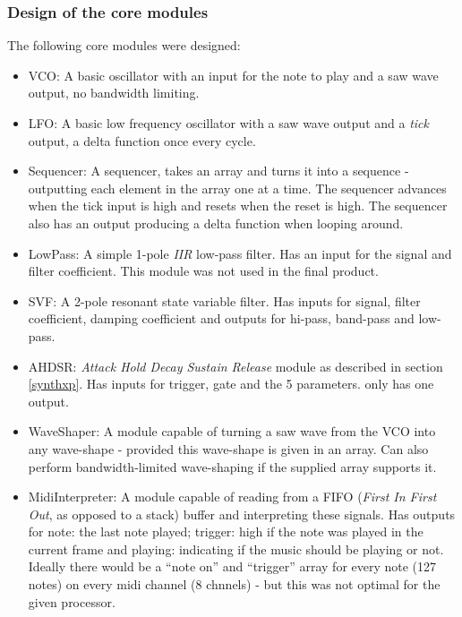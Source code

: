 \subsubsection{Design of the core modules}
The following core modules were designed:
\begin{itemize}
  \item VCO: A basic oscillator with an input for the note to play and a saw
  wave output, no bandwidth limiting.
  \item LFO: A basic low frequency oscillator with a saw wave output and a
  \emph{tick} output, a delta function once every cycle.
  \item Sequencer: A sequencer, takes an array and turns it into a sequence -
  outputting each element in the array one at a time. The sequencer advances
  when the tick input is high and resets when the reset is high. The sequencer
  also has an output producing a delta function when looping around.
  \item LowPass: A simple 1-pole \emph{IIR} low-pass filter. Has an input for
  the signal and filter coefficient. This module was not used in the final product.
  \item SVF: A 2-pole resonant state variable filter. Has inputs for signal,
  filter coefficient, damping coefficient and outputs for hi-pass, band-pass and
  low-pass.
  \item AHDSR: \emph{Attack Hold Decay Sustain Release} module as described in
  section \ref{synthxp}. Has inputs for trigger, gate and the 5 parameters. only
  has one output.
  \item WaveShaper: A module capable of turning a saw wave from the VCO into any
  wave-shape - provided this wave-shape is given in an array. Can also perform
  bandwidth-limited wave-shaping if the supplied array supports it.
  \item MidiInterpreter: A module capable of reading from a FIFO (\emph{First
  In First Out}, as opposed to a stack) buffer and interpreting these signals.
  Has outputs for note: the last note played; trigger: high if the note was
  played in the current frame and playing: indicating if the music should be
  playing or not. Ideally there would be a ``note on'' and ``trigger'' array for
  every note (127 notes) on every midi channel (8 chnnels) - but this was not
  optimal for the given processor.
  \end{itemize}

